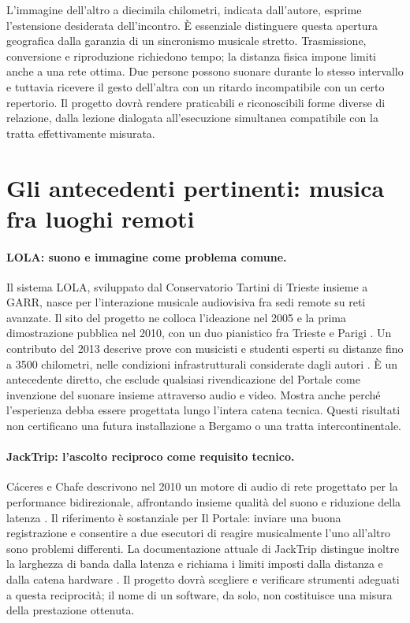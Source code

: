 L'immagine dell'altro a diecimila chilometri, indicata dall'autore, esprime l'estensione desiderata dell'incontro. È essenziale distinguere questa apertura geografica dalla garanzia di un sincronismo musicale stretto. Trasmissione, conversione e riproduzione richiedono tempo; la distanza fisica impone limiti anche a una rete ottima. Due persone possono suonare durante lo stesso intervallo e tuttavia ricevere il gesto dell'altra con un ritardo incompatibile con un certo repertorio. Il progetto dovrà rendere praticabili e riconoscibili forme diverse di relazione, dalla lezione dialogata all'esecuzione simultanea compatibile con la tratta effettivamente misurata.

\section{Gli antecedenti pertinenti: musica fra luoghi remoti}

\paragraph{LOLA: suono e immagine come problema comune.}
Il sistema LOLA, sviluppato dal Conservatorio Tartini di Trieste insieme a GARR, nasce per l'interazione musicale audiovisiva fra sedi remote su reti avanzate. Il sito del progetto ne colloca l'ideazione nel 2005 e la prima dimostrazione pubblica nel 2010, con un duo pianistico fra Trieste e Parigi \cite{teleconc_lola}. Un contributo del 2013 descrive prove con musicisti e studenti esperti su distanze fino a 3500 chilometri, nelle condizioni infrastrutturali considerate dagli autori \cite{teleconc_drioli2013}. È un antecedente diretto, che esclude qualsiasi rivendicazione del Portale come invenzione del suonare insieme attraverso audio e video. Mostra anche perché l'esperienza debba essere progettata lungo l'intera catena tecnica. Questi risultati non certificano una futura installazione a Bergamo o una tratta intercontinentale.

\paragraph{JackTrip: l'ascolto reciproco come requisito tecnico.}
Cáceres e Chafe descrivono nel 2010 un motore di audio di rete progettato per la performance bidirezionale, affrontando insieme qualità del suono e riduzione della latenza \cite{teleconc_jacktrip2010}. Il riferimento è sostanziale per Il Portale: inviare una buona registrazione e consentire a due esecutori di reagire musicalmente l'uno all'altro sono problemi differenti. La documentazione attuale di JackTrip distingue inoltre la larghezza di banda dalla latenza e richiama i limiti imposti dalla distanza e dalla catena hardware \cite{teleconc_jacktriplatency}. Il progetto dovrà scegliere e verificare strumenti adeguati a questa reciprocità; il nome di un software, da solo, non costituisce una misura della prestazione ottenuta.


